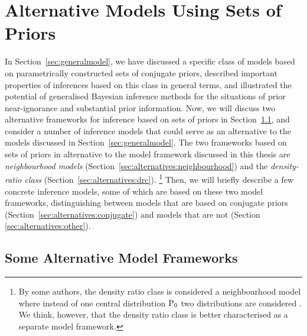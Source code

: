 \section{Alternative Models Using Sets of Priors}
\label{sec:alternatives}


In Section~\ref{sec:generalmodel},
we have discussed a specific class of models based on parametrically constructed sets of conjugate priors,
described important properties of inferences based on this class in general terms,
and illustrated the potential of generalised Bayesian inference methods
for the situations of prior near-ignorance and substantial prior information.
Now, we will discuss two alternative frameworks for inference based on sets of priors in Section~\ref{sec:alternatives:frameworks},
and consider a number of inference models that could serve as an alternative to the models discussed in Section~\ref{sec:generalmodel}.
The two frameworks based on sets of priors
in alternative to the model framework discussed in this thesis are 
\emph{neighbourhood models} (Section~\ref{sec:alternatives:neighbourhood}) and
the \emph{density-ratio class} (Section~\ref{sec:alternatives:drc}).%
\footnote{By some authors, the density ratio class is considered a neighbourhood model
where instead of one central distribution $\operatorname{P}_0$ two distributions are considered
\parencite[e.g.,][\S 4.3]{1991:pericchi}.
We think, however, that the density ratio class is better characterised as a separate model framework.}
Then, we will briefly describe a few concrete inference models,
some of which are based on these two model frameworks,
distinguishing between models that are based on conjugate priors (Section~\ref{sec:alternatives:conjugate})
and models that are not (Section \ref{sec:alternatives:other}).


\subsection{Some Alternative Model Frameworks}
\label{sec:alternatives:frameworks}

